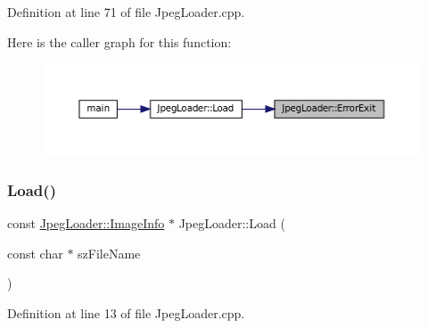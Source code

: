 Definition at line 71 of file Jpeg\+Loader.\+cpp.

Here is the caller graph for this function\+:
\nopagebreak
\begin{figure}[H]
\begin{center}
\leavevmode
\includegraphics[width=350pt]{classJpegLoader_a689be6001605f12b808d82d49eaaba4e_icgraph}
\end{center}
\end{figure}
\mbox{\label{classJpegLoader_a094609a59107dfbd1cca84fa2467c926}} 
\subsubsection{\texorpdfstring{Load()}{Load()}}
{\footnotesize\ttfamily const \mbox{\hyperlink{structJpegLoader_1_1ImageInfo}{Jpeg\+Loader\+::\+Image\+Info}} $\ast$ Jpeg\+Loader\+::\+Load (\begin{DoxyParamCaption}\item[{const char $\ast$}]{sz\+File\+Name }\end{DoxyParamCaption})}



Definition at line 13 of file Jpeg\+Loader.\+cpp.

